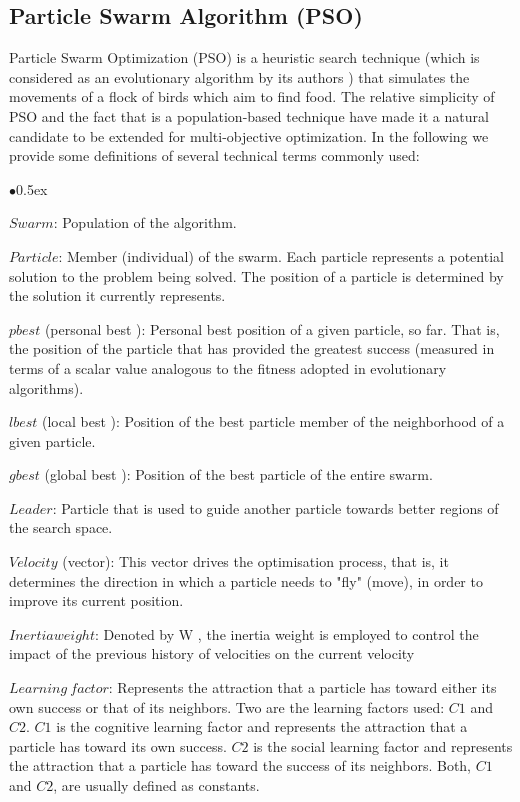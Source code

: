 \documentclass[11pt, runningheads,a4paper]{llncs}
\begin{document}
\subsection{Particle Swarm Algorithm (PSO)}
Particle Swarm Optimization (PSO) is a heuristic search technique (which is considered as an evolutionary algorithm by its authors \cite{pso1998}) that simulates the movements of a flock of birds which aim to find food. The relative simplicity of PSO and the fact that is a population-based technique have made it a natural candidate to be extended for multi-objective optimization.
In the following we provide some definitions of several technical terms commonly used:
\begin{list}{$\bullet$}{\itemsep 0.5ex}

\item $Swarm$:  Population of the algorithm.

\item $Particle$:  Member (individual) of the swarm. Each particle represents a potential solution to the problem being solved. The position of a particle is determined by the solution it currently represents.

\item $pbest$  (personal best ):  Personal best position of a given particle, so far. That is, the position of the particle that has provided the greatest success (measured in terms of a scalar value analogous to the fitness adopted in evolutionary algorithms).

\item $lbest$  (local best ):  Position of the best particle member of the neighborhood of a given particle.

\item $gbest$  (global best ):  Position of the best particle of the entire swarm.
\item $Leader$:  Particle that is used to guide another particle towards better regions of the search space.

\item $Velocity$ (vector):  This vector drives the optimisation process, that is, it determines the direction in which a particle needs to "fly" (move), in order to improve its current position.
\item $Inertia weight$:  Denoted by W , the inertia weight is employed to control the impact of the previous history of velocities on the current velocity
\item $Learning\ factor$: Represents the attraction that a particle has toward either its own success or that of its neighbors. Two are the learning factors used: $C1$ and $C2$. $C1$ is the cognitive learning factor and represents the attraction that a particle has toward its own success. $C2$ is the social learning factor and represents the attraction that a particle has toward the success of its neighbors. Both, $C1$ and $C2$, are usually defined as constants.


\end{list}
\end{document}
